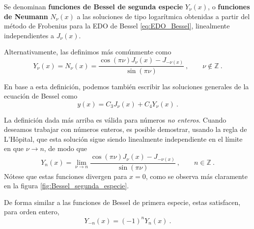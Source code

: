\begin{defi} 
    Se denominan \textbf{funciones de Bessel de segunda especie} $Y_\nu(x)$, o \textbf{funciones de Neumann} $N_\nu(x)$ a las soluciones de tipo logarítmica obtenidas a partir del método de Frobenius para la EDO de Bessel \eqref{eq:EDO_Bessel}, linealmente independientes a $J_\nu(x)$.

    Alternativamente, las definimos más comúnmente como
    \begin{equation}
        Y_\nu(x) = N_\nu(x) = \frac{\cos(\pi \nu) J_\nu(x) - J_{-\nu(x)}}{\sin(\pi \nu)} \ , \qquad \nu \notin \mathbb{Z} \ .
    \end{equation}
\end{defi}

En base a esta definición, podemos también escribir las soluciones generales de la ecuación de Bessel como
\begin{equation}
    y(x) = C_3 J_\nu(x) + C_4 Y_\nu(x) \ .
\end{equation}

La definición dada más arriba es válida para números \emph{no enteros}. Cuando deseamos trabajar con números enteros, es posible demostrar, usando la regla de L'Hôpital, que esta solución sigue siendo linealmente independiente en el límite en que $\nu \to n$, de modo que
\begin{equation}
    Y_n(x) = \lim_{\nu \to n} \frac{\cos(\pi \nu) J_\nu(x) - J_{-\nu(x)}}{\sin(\pi \nu)} \ , \qquad n \in \mathbb{Z} \ .
\end{equation}
Nótese que estas funciones divergen para $x = 0$, como se observa más claramente en la figura \ref{fig:Bessel_segunda_especie}.

De forma similar a las funciones de Bessel de primera especie, estas satisfacen, para orden entero, 
\begin{equation}
    Y_{-n}(x) = (-1)^n Y_n(x) \ .
\end{equation}

